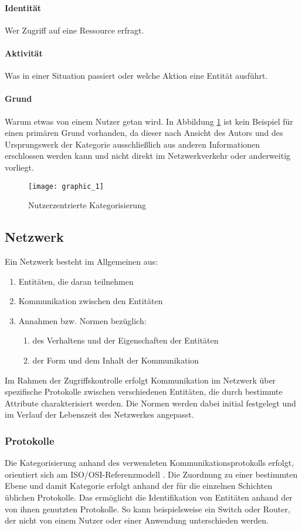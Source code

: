 \paragraph{Identität}
Wer Zugriff auf eine Ressource erfragt.
\paragraph{Aktivität}
Was in einer Situation passiert oder welche Aktion eine Entität ausführt.
\paragraph{Grund}
Warum etwas von einem Nutzer getan wird. In Abbildung \ref{Tax_1} ist kein Beispiel für einen primären Grund vorhanden, da dieser nach Ansicht des Autors und des Ursprungswerk der Kategorie \cite{abowd_towards_1999} ausschließlich aus anderen Informationen erschlossen werden kann und nicht direkt im Netzwerkverkehr oder anderweitig vorliegt.
\begin{figure}[H]
\label{Tax_1}
\centering
\texttt{[image: graphic\_1]}
\caption{Nutzerzentrierte Kategorisierung}
\end{figure}
\subsection{Netzwerk}
Ein Netzwerk besteht im Allgemeinen aus:
\begin{enumerate}
\item{Entitäten, die daran teilnehmen}
\item{Kommunikation zwischen den Entitäten}
\item{Annahmen bzw. Normen bezüglich:}
\begin{enumerate}
	\item{des Verhaltens und der Eigenschaften der Entitäten}
	\item{der Form und dem Inhalt der Kommunikation}
\end{enumerate}
\end{enumerate}
Im Rahmen der Zugriffskontrolle erfolgt Kommunikation im Netzwerk über spezifische Protokolle zwischen verschiedenen Entitäten, die durch bestimmte Attribute charakterisiert werden. Die Normen werden dabei initial festgelegt und im Verlauf der Lebenszeit des Netzwerkes angepasst.
\subsubsection{Protokolle}
Die Kategorisierung anhand des verwendeten Kommunikationsprotokolls erfolgt, orientiert sich am ISO/OSI-Referenzmodell \cite{day1983osi}. Die Zuordnung zu einer bestimmten Ebene und damit Kategorie erfolgt anhand der für die einzelnen Schichten üblichen Protokolle. Das ermöglicht die Identifikation von Entitäten anhand der von ihnen genutzten Protokolle. So kann beispielsweise ein Switch oder Router, der nicht von einem Nutzer oder einer Anwendung unterschieden werden.

